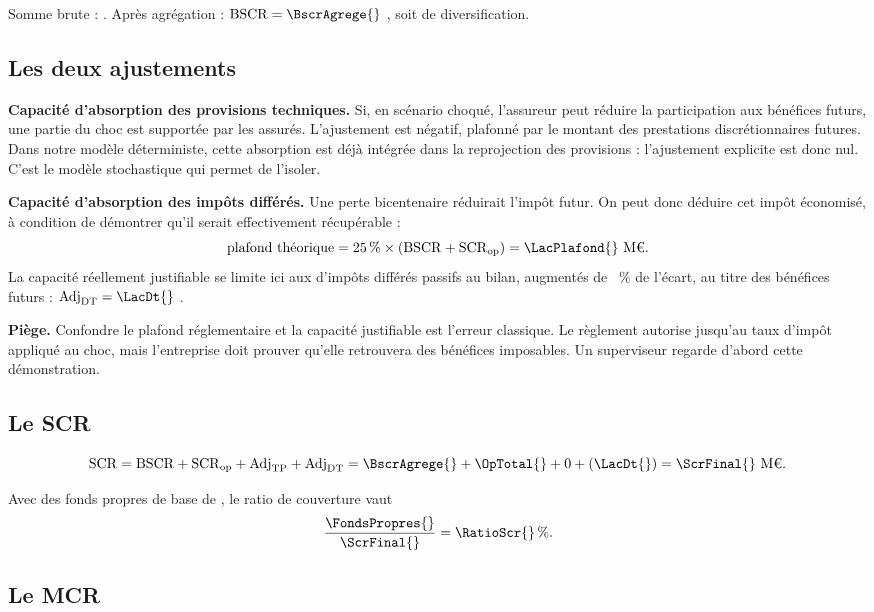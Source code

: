 \documentclass[11pt,a4paper]{article}
\newcommand{\piege}[1]{\par\smallskip\noindent\textcolor{rouge}{\textbf{Piège.}} #1\par\smallskip}
\newcommand{\Meuro}{\text{M\texteuro}}
\begin{document}
Somme brute : \BscrSomme{} \Meuro{}. Après agrégation : $\mathrm{BSCR} = \BscrAgrege{}$ \Meuro{},
soit \BscrDiversification{} \Meuro{} de diversification.

\subsection{Les deux ajustements}

\textbf{Capacité d'absorption des provisions techniques.} Si, en scénario choqué, l'assureur peut
réduire la participation aux bénéfices futurs, une partie du choc est supportée par les assurés.
L'ajustement est négatif, plafonné par le montant des prestations discrétionnaires futures. Dans
notre modèle déterministe, cette absorption est déjà intégrée dans la reprojection des
provisions : l'ajustement explicite est donc nul. C'est le modèle stochastique qui permet de
l'isoler.

\textbf{Capacité d'absorption des impôts différés.} Une perte bicentenaire réduirait l'impôt
futur. On peut donc déduire cet impôt économisé, à condition de démontrer qu'il serait
effectivement récupérable :
\[
\text{plafond théorique} = 25\,\% \times (\mathrm{BSCR} + \mathrm{SCR}_{\text{op}}) = \LacPlafond{}~\Meuro{}.
\]
La capacité réellement justifiable se limite ici aux \LacIdp{} \Meuro{} d'impôts différés passifs
au bilan, augmentés de \LacPart{}~\% de l'écart, au titre des bénéfices futurs :
$\mathrm{Adj}_{\mathrm{DT}} = \LacDt{}$ \Meuro{}.

\piege{Confondre le plafond réglementaire et la capacité justifiable est l'erreur classique. Le
règlement autorise jusqu'au taux d'impôt appliqué au choc, mais l'entreprise doit prouver qu'elle
retrouvera des bénéfices imposables. Un superviseur regarde d'abord cette démonstration.}

\subsection{Le SCR}

\[
\mathrm{SCR} = \mathrm{BSCR} + \mathrm{SCR}_{\text{op}} + \mathrm{Adj}_{\mathrm{TP}}
+ \mathrm{Adj}_{\mathrm{DT}}
= \BscrAgrege{} + \OpTotal{} + 0 + (\LacDt{}) = \ScrFinal{}~\Meuro{}.
\]

Avec des fonds propres de base de \FondsPropres{} \Meuro{}, le ratio de couverture vaut
\[
\frac{\FondsPropres{}}{\ScrFinal{}} = \RatioScr{}\,\%.
\]

\subsection{Le MCR}
\end{document}
